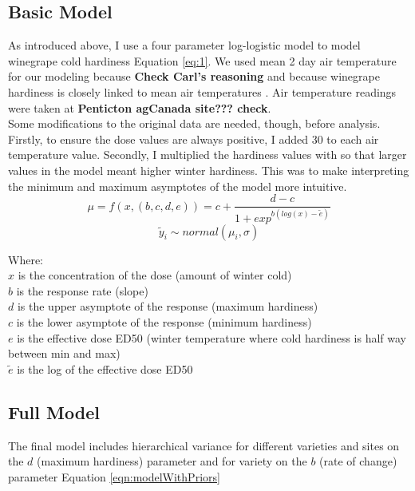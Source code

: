 \documentclass[11pt,letter]{article}
\begin{document}
\subsection {Basic Model}

As introduced above, I use a four parameter log-logistic model to model winegrape cold hardiness Equation \eqref{eq:1}. We used mean 2 day air temperature for our modeling because \textbf{Check Carl's reasoning} and because winegrape hardiness is closely linked to mean air temperatures \cite{Hubackova1996}. Air temperature readings were taken at \textbf{Penticton agCanada site??? check}. \\

Some modifications to the original data are needed, though, before analysis. Firstly, to ensure the dose values are always positive, I added 30 to each air temperature value. Secondly, I multiplied the hardiness values with  so that larger values in the model meant higher winter hardiness. This was to make interpreting the minimum and maximum asymptotes of the model more intuitive. \\

\begin{equation*}
\label{eq:1}
\mu=f(x,(b,c,d,e))=c+\frac{d-c}{1+exp^{b(log(x)-\tilde{e})}}
\end{equation*}
\begin{equation*}
\label{eq:2}
\tilde{y}_{i}\sim normal(\mu_{i},\sigma)
\end{equation*}

Where:\\
	$x$ is the concentration of the dose (amount of winter cold) \\
	$b$ is the response rate (slope)\\
	$d$ is the upper asymptote of the response (maximum hardiness)\\
	$c$ is the lower asymptote of the response (minimum hardiness)\\
	$e$ is the effective dose ED50 (winter temperature where cold hardiness is half way between min and max)  \\
	$\tilde{e}$ is the log of the effective dose ED50\\

\subsection {Full Model}

The final model includes hierarchical variance for different varieties and sites on the $d$ (maximum hardiness) parameter and for variety on the $b$ (rate of change) parameter Equation \ref{eqn:modelWithPriors} \\
\end{document}
